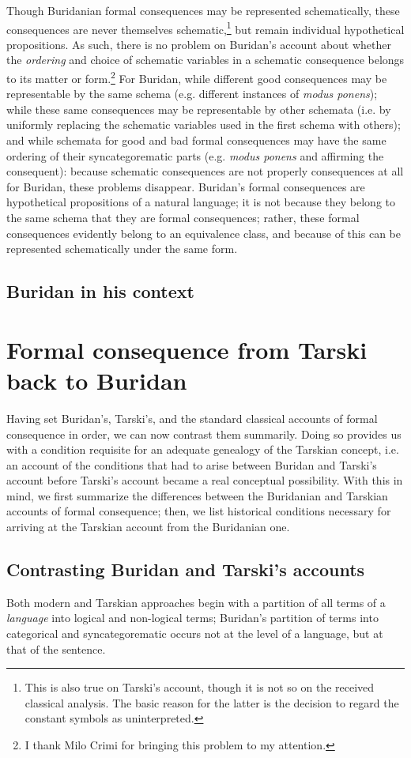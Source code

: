 \documentclass[]{article}
\begin{document}
Though Buridanian formal consequences may be represented schematically, these consequences are never themselves schematic,\footnote{This is also true on Tarski's account, though it is not so on the received classical analysis. The basic reason for the latter is the decision to regard the constant symbols as uninterpreted.} but remain individual hypothetical propositions. As such, there is no problem on Buridan's account about whether the \textit{ordering} and choice of schematic variables in a schematic consequence belongs to its matter or form.\footnote{I thank Milo Crimi for bringing this problem to my attention.} For Buridan, while different good consequences may be representable by the same schema (e.g. different instances of \textit{modus ponens}); while these same consequences may be representable by other schemata (i.e. by uniformly replacing the schematic variables used in the first schema with others); and while schemata for good and bad formal consequences may have the same ordering of their syncategorematic parts (e.g. \textit{modus ponens} and affirming the consequent): because schematic consequences are not properly consequences at all for Buridan, these problems disappear. Buridan's formal consequences are hypothetical propositions of a natural language; it is not because they belong to the same schema that they are formal consequences; rather, these formal consequences evidently belong to an equivalence class, and because of this can be represented schematically under the same form.
\subsection{Buridan in his context}
\section{Formal consequence from Tarski back to Buridan}
Having set Buridan's, Tarski's, and the standard classical accounts of formal consequence in order, we can now contrast them summarily. Doing so provides us with a condition requisite for an adequate genealogy of the Tarskian concept, i.e. an account of the conditions that had to arise between Buridan and Tarski's account before Tarski's account became a real conceptual possibility. With this in mind, we first summarize the differences between the Buridanian and Tarskian accounts of formal consequence; then, we list historical conditions necessary for arriving at the Tarskian account from the Buridanian one.
\subsection{Contrasting Buridan and Tarski's accounts}
Both modern and Tarskian approaches begin with a partition of all terms of a \textit{language} into logical and non-logical terms; Buridan's partition of terms into categorical and syncategorematic occurs not at the level of a language, but at that of the sentence. 
\end{document}

